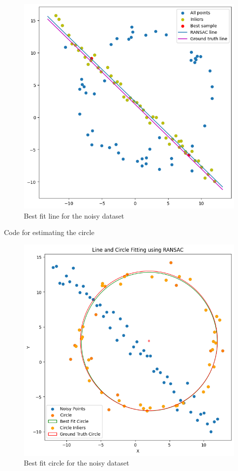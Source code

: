 \documentclass[11pt,a4paper]{article}
\begin{document}
{\begin{figure}[h]
    \centering
    \includegraphics[width=0.75\linewidth]{images/2.png}
    \caption{Best fit line for the noisy dataset}
\end{figure}}

Code for estimating the circle

\lstset{style=mystyle}


{\begin{figure}[h]
    \centering
    \includegraphics[width=0.75\linewidth]{images/22.png}
    \caption{Best fit circle for the noisy dataset}
\end{figure}}

\newpage
\end{document}
